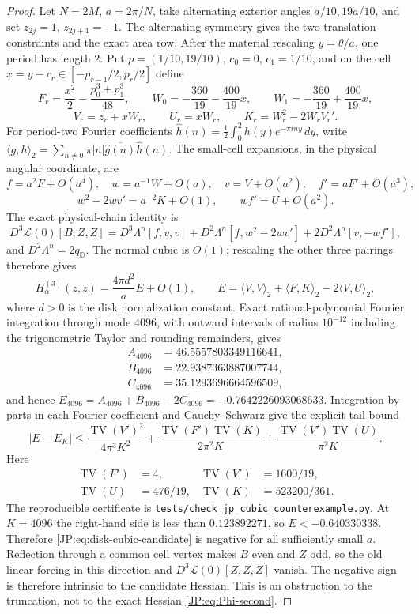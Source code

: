 \begin{proof}
Let $N=2M$, $a=2\pi/N$, take alternating exterior angles
$a/10,19a/10$, and set $z_{2j}=1$, $z_{2j+1}=-1$.  The alternating
symmetry gives the two translation constraints and the exact area row.
After the material rescaling $y=\theta/a$, one period has length $2$.
Put $p=(1/10,19/10)$, $c_0=0$, $c_1=1/10$, and on the cell
$x=y-c_r\in[-p_{r-1}/2,p_r/2]$ define
\[
 F_r=\frac{x^2}{2}-\frac{p_0^3+p_1^3}{48},\qquad
 W_0=-\frac{360}{19}-\frac{400}{19}x,\qquad
 W_1=-\frac{360}{19}+\frac{400}{19}x,
\]
\[
 V_r=z_r+xW_r,\qquad U_r=xW_r,\qquad
 K_r=W_r^2-2W_rV_r'.
\]
For period-two Fourier coefficients
$\widehat h(n)=\frac12\int_0^2h(y)e^{-\pi iny}\,dy$, write
\(
 \langle g,h\rangle_2
 =\sum_{n\ne0}\pi|n|\overline{\widehat g(n)}\widehat h(n).
\)
The small-cell expansions, in the physical angular coordinate, are
\[
 f=a^2F+O(a^4),\quad w=a^{-1}W+O(a),\quad
 v=V+O(a^2),\quad f'=aF'+O(a^3),
\]
\[
 w^2-2wv'=a^{-2}K+O(1),\qquad wf'=U+O(a^2).
\]
The exact physical-chain identity is
\[
 D^3\mathcal L(0)[B,Z,Z]
 =D^3\Lambda^n[f,v,v]
  +D^2\Lambda^n[f,w^2-2wv']
  +2D^2\Lambda^n[v,-wf'],
\]
and $D^2\Lambda^n=2q_{\mathbb D}$.  The normal cubic is $O(1)$;
rescaling the other three pairings therefore gives
\[
 H^{(3)}_\alpha(z,z)=\frac{4\pi d^2}{a}E+O(1),\qquad
 E=\langle V,V\rangle_2+\langle F,K\rangle_2
       -2\langle V,U\rangle_2,
\]
where $d>0$ is the disk normalization constant.  Exact rational-polynomial
Fourier integration through mode $4096$, with outward intervals of radius
$10^{-12}$ including the trigonometric Taylor and rounding remainders,
gives
\begin{align*}
 A_{4096}&=46.5557803349116641,\\
 B_{4096}&=22.9387363887007744,\\
 C_{4096}&=35.1293696664596509,
\end{align*}
and hence $E_{4096}=A_{4096}+B_{4096}-2C_{4096}
=-0.7642226093068633$.  Integration by parts in each Fourier coefficient
and Cauchy--Schwarz give the explicit tail bound
\[
 |E-E_K|\le
 \frac{\operatorname{TV}(V')^2}{4\pi^3K^2}
 +\frac{\operatorname{TV}(F')\operatorname{TV}(K)}{2\pi^2K}
 +\frac{\operatorname{TV}(V')\operatorname{TV}(U)}{\pi^2K}.
\]
Here
\begin{align*}
 \operatorname{TV}(F')&=4,&
 \operatorname{TV}(V')&=1600/19,\\
 \operatorname{TV}(U)&=476/19,&
 \operatorname{TV}(K)&=523200/361.
\end{align*}
The reproducible certificate is
\nolinkurl{tests/check_jp_cubic_counterexample.py}.  At $K=4096$ the
right-hand side is less than $0.123892271$, so
$E<-0.640330338$.  Therefore \eqref{JP:eq:disk-cubic-candidate} is negative
for all sufficiently small $a$.  Reflection through a common cell vertex
makes $B$ even and $Z$ odd, so the old linear forcing in this direction and
$D^3\mathcal L(0)[Z,Z,Z]$ vanish.  The negative sign is therefore intrinsic
to the candidate Hessian.  This is an obstruction to the truncation, not
to the exact Hessian \eqref{JP:eq:Phi-second}.
\end{proof}

